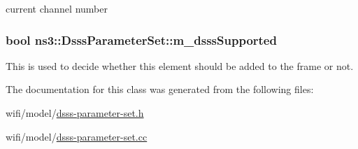 current channel number 

\subsubsection[{\texorpdfstring{m\+\_\+dsss\+Supported}{m_dsssSupported}}]{\setlength{\rightskip}{0pt plus 5cm}bool ns3\+::\+Dsss\+Parameter\+Set\+::m\+\_\+dsss\+Supported\hspace{0.3cm}{\ttfamily [private]}}\hypertarget{classns3_1_1DsssParameterSet_a3507c996fca93994388dda22fddc3ded}{}\label{classns3_1_1DsssParameterSet_a3507c996fca93994388dda22fddc3ded}


This is used to decide whether this element should be added to the frame or not. 



The documentation for this class was generated from the following files\+:\begin{DoxyCompactItemize}
\item 
wifi/model/\hyperlink{dsss-parameter-set_8h}{dsss-\/parameter-\/set.\+h}\item 
wifi/model/\hyperlink{dsss-parameter-set_8cc}{dsss-\/parameter-\/set.\+cc}\end{DoxyCompactItemize}
